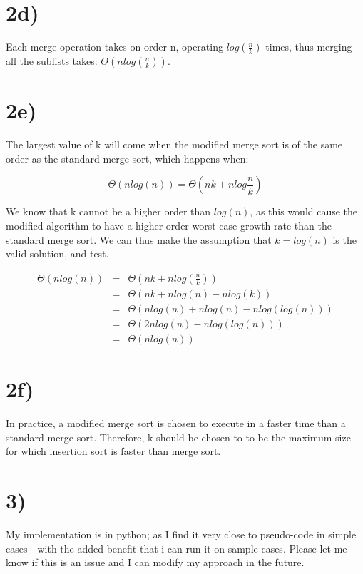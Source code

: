 \documentclass[a4paper,11pt]{article}
\begin{document}
\section*{2d)}
Each merge operation takes on order n, operating $log(\frac{n}{k})$ times, thus merging all the sublists takes: $\Theta(n log(\frac{n}{k}))$.

\section*{2e)}
The largest value of k will come when the modified merge sort is of the same order as the standard merge sort, which happens when:

\begin{equation}
\Theta(n log(n)) = \Theta(nk + nlog\frac{n}{k})
\end{equation}

We know that k cannot be a higher order than $log(n)$, as this would cause the modified algorithm to have a higher order 
worst-case growth rate than the standard merge sort.  We can thus make the assumption that $k=log(n)$ is the valid solution, 
and test.

\begin{eqnarray}
\Theta(n log(n)) &=& \Theta(nk + nlog(\frac{n}{k})) \\
&=& \Theta(nk + nlog(n) - nlog(k)) \\
&=& \Theta(nlog(n) + nlog(n)- nlog(log(n))) \\
&=& \Theta(2nlog(n) - nlog(log(n))) \\
&=& \Theta(nlog(n))
\end{eqnarray}


\section*{2f)}
In practice, a modified merge sort is chosen to execute in a faster time than a standard merge sort.  Therefore, k should be 
chosen to to be the maximum size for which insertion sort is faster than merge sort.  


\section*{3)} 
My implementation is in python; as I find it very close to pseudo-code in simple cases - with the added benefit that i can run it
on sample cases.  Please let me know if this is an issue and I can modify my approach in the future.
\end{document}
